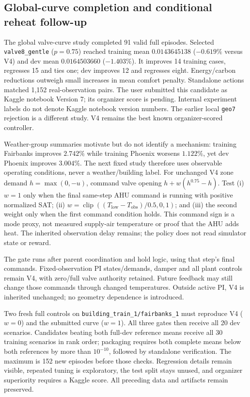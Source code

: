 

\subsection{Global-curve completion and conditional reheat follow-up}
The global valve-curve study completed 91 valid full episodes. Selected
\texttt{valve8\_gentle} ($p=0.75$) reached training mean $0.0143645138$
($-0.619\%$ versus V4) and dev mean $0.0164503660$ ($-1.403\%$).
It improves 14 training cases, regresses 15 and ties one; dev improves 12
and regresses eight. Energy/carbon reductions outweigh small increases in
mean comfort penalty. Standalone actions matched 1,152 real-observation pairs.
The user submitted this candidate as Kaggle notebook Version 7; its organizer
score is pending. Internal experiment labels do not denote Kaggle notebook
version numbers. The earlier local \texttt{geo7} rejection is a different study.
V4 remains the best known organizer-scored controller.

Weather-group summaries motivate but do not identify a mechanism: training
Fairbanks improves $2.742\%$ while training Phoenix worsens $1.122\%$, yet
dev Phoenix improves $3.004\%$. The next fixed study therefore uses observable
operating conditions, never a weather/building label. For unchanged V4 zone
demand $h=\max(0,-u)$, command valve opening
$h+w(h^{0.75}-h)$. Test (i) $w=1$ only when the final same-step AHU command is
running with positive normalized SAT; (ii)
$w=\operatorname{clip}((T_{\mathrm{low}}-T_{\mathrm{obs}})/0.5,0,1)$; and
(iii) the second weight only when the first command condition holds.
This command sign is a mode proxy, not measured supply-air temperature or
proof that the AHU adds heat. The inherited observation delay remains;
the policy does not read simulator state or reward.

The gate runs after parent coordination and hold logic, using that step's
final commands. Fixed-observation PI states/demands, damper and all plant
controls remain V4, with zero/full valve authority retained. Future feedback
may still change those commands through changed temperatures. Outside active
PI, V4 is inherited unchanged; no geometry dependence is introduced.

Two fresh full controls on \texttt{building\_train\_1/fairbanks\_1} must
reproduce V4 ($w=0$) and the submitted curve ($w=1$). All three gates then
receive all 20 dev scenarios. Candidates beating both full-dev reference
means receive all 30 training scenarios in rank order; packaging requires
both complete means below both references by more than $10^{-10}$, followed
by standalone verification. The maximum is 152 new episodes before those
checks. Regression details remain visible, repeated tuning is exploratory,
the test split stays unused, and organizer superiority requires a Kaggle score.
All preceding data and artifacts remain preserved.

